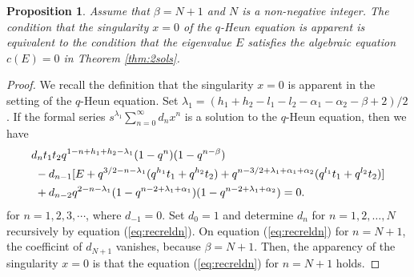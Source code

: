 \documentclass[12pt]{amsart}
\numberwithin{equation}{section}
\newtheorem{prop}[thm]{Proposition}
\theoremstyle{definition}
\theoremstyle{remark}
\begin{document}
\begin{prop} 
Assume that $\beta = N +1 $ and $N$ is a non-negative integer.
The condition that the singularity $x=0$ of the $q$-Heun equation is apparent is equivalent to the condition that the eigenvalue $E$ satisfies the algebraic equation $c(E)=0$ in Theorem \ref{thm:2sols}.
\end{prop}
\begin{proof}
We recall the definition that the singularity $x=0$ is apparent in the setting of the $q$-Heun equation.
Set $\lambda_{1} = (h_{1} + h_{2} - l_{1} - l_{2} - \alpha_{1} - \alpha_{2} - \beta + 2)/2$.
If the formal series $ s^{\lambda _{1}} \sum_{n =0}^{\infty } d_{n} x^{n} $ is a solution to the $q$-Heun equation, then we have
\begin{align}
 & d_{n} t_{1}t_{2}q^{  1- n + h_{1} + h_{2} - \lambda _{1}} (1 - q^{n})(1 - q^{n - \beta }) \label{eq:recreldn} \\
 & \ - d_{n - 1} [E + q^{3/2- n - \lambda _{1} } (q^{h_{1}}t_{1} + q^{h_{2}}t_{2} ) + q^{n - 3/2 + \lambda _{1} + \alpha _{1} + \alpha _{2} }( q^{l_{1}}t_{1} + q^{l_{2}}t_{2} ) ] \notag \\
 & \ + d_{n - 2} q^{ 2- n - \lambda _{1} } (1 - q^{n - 2 + \lambda _{1} + \alpha _{1} })(1 - q^{n - 2 + \lambda _{1} + \alpha _{2} }) = 0 . \notag
  \end{align}
for $n = 1 ,2,3, \cdots $, where $d_{-1} =0$.
Set $d_0=1$ and determine $d_n$ for $n=1,2,\dots ,N$ recursively by equation (\ref{eq:recreldn}).
On equation (\ref{eq:recreldn}) for $n=N+1$, the coefficint of $d_{N+1}$ vanishes, because $\beta = N +1 $.
Then, the apparency of the singularity $x=0$ is that the equation (\ref{eq:recreldn}) for $n=N+1$ holds.


\end{proof}
\end{document}
